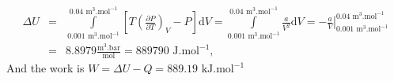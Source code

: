\documentclass[calculator,allquestions,datasheet,mock,solutions]{exam_newMarcus2}
\newcommand{\frc}{\displaystyle\frac}
\renewcommand{\d}[1]{\mathrm{d} #1 }
\begin{document}
\begin{question}
\begin{enumerate}[(a)]
{       \begin{eqnarray}
         \Delta U &=& \int\limits_{0.001\text{ m}^{3}.\text{mol}^{-1}}^{0.04\text{ m}^{3}.\text{mol}^{-1}}\left[T\left(\frc{\partial P}{\partial T}\right)_{V}-P\right]\d V = \int\limits_{0.001\text{ m}^{3}.\text{mol}^{-1}}^{0.04\text{ m}^{3}.\text{mol}^{-1}} \frc{a}{V^{2}} \d V = -\left.\frc{a}{V}\right|_{0.001\text{ m}^{3}.\text{mol}^{-1}}^{0.04\text{ m}^{3}.\text{mol}^{-1}} \nonumber \\
                  &=& 8.8979\frc{\text{m}^{3}.\text{bar}}{\text{mol}} = 889790\text{ J.mol}^{-1}, \nonumber
       \end{eqnarray}
       And the work is $W= \Delta U - Q = 889.19\text{ kJ.mol}^{-1}$~

}
%
\end{enumerate} 
%
\end{question}

\clearpage
\end{document}

